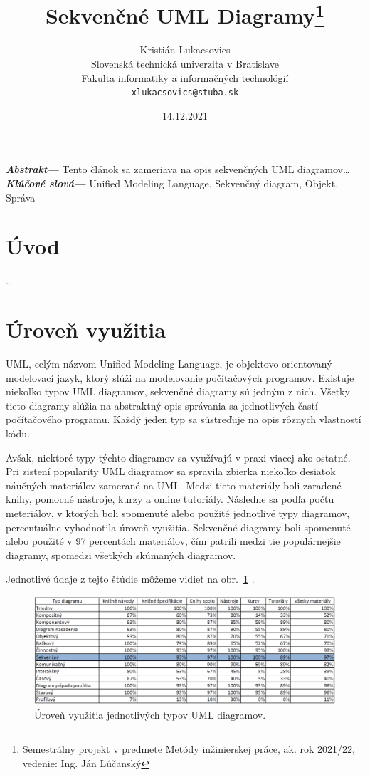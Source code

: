 \documentclass[10pt,slovak,a4paper]{article}
\title{Sekvenčné UML Diagramy\thanks{Semestrálny projekt v predmete Metódy inžinierskej práce, ak. rok 2021/22, vedenie: Ing. Ján Lúčanský}}
\author{Kristián Lukacsovics\\[2pt]
    {\small Slovenská technická univerzita v Bratislave}\\
    {\small Fakulta informatiky a informačných technológií}\\
    {\small \texttt{xlukacsovics@stuba.sk}}
    }
\date{\small 14.12.2021}
\providecommand{\abstr}[1]{\textbf{\textit{Abstrakt---}} #1}
\providecommand{\keywords}[1]{\textbf{\textit{Klúčové slová---}} #1}
\begin{document}
\maketitle

\abstr{Tento článok sa zameriava na opis sekvenčných UML diagramov\ldots\newline}
\indent\keywords{Unified Modeling Language, Sekvenčný diagram, Objekt, Správa}

\section{Úvod}
\ldots

\section{Úroveň využitia}
UML, celým názvom Unified Modeling Language, je objektovo-orientovaný modelovací jazyk, ktorý slúži na modelovanie počítačových programov. \cite{eriksson98}
Existuje niekoľko typov UML diagramov, sekvenčné diagramy sú jedným z nich. Všetky tieto diagramy slúžia na
abstraktný opis správania sa jednotlivých častí počítačového programu. Každý jeden typ sa sústreďuje na opis
rôznych vlastností kódu. \cite{petraq14} \newline

\noindent Avšak, niektoré typy týchto diagramov sa využívajú v praxi viacej ako ostatné. Pri zistení popularity UML diagramov sa spravila zbierka niekoľko desiatok náučných
materiálov zamerané na UML. Medzi tieto materiály boli zaradené knihy, pomocné nástroje, kurzy a online tutoriály. Následne sa podľa počtu meteriálov, v ktorých boli spomenuté alebo použité
jednotlivé typy diagramov, percentuálne vyhodnotila úroveň využitia. Sekvenčné diagramy boli spomenuté alebo použité v 97 percentách materiálov, čím patrili medzi tie populárnejšie diagramy, spomedzi všetkých skúmaných diagramov. \cite{reggio13} \newline

\noindent Jednotlivé údaje z tejto štúdie môžeme vidieť na obr.~\ref{tab} .

\begin{figure}[tbh]
\centering
\includegraphics[scale=0.5]{tab.pdf}
\caption{Úroveň využitia jednotlivých typov UML diagramov. \cite{reggio13}}
\label{tab}
\end{figure}
\end{document}
